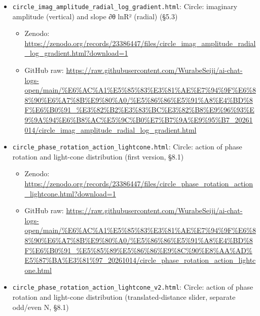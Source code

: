 \documentclass[
  a4paper,
]{article}
\providecommand{\tightlist}{%
  \setlength{\itemsep}{0pt}\setlength{\parskip}{0pt}}
\begin{document}
\begin{itemize}
\tightlist
\item
  \texttt{circle\_\allowbreak{}imag\_\allowbreak{}amplitude\_\allowbreak{}radial\_\allowbreak{}log\_\allowbreak{}gradient.html}: Circle:
  imaginary amplitude (vertical) and slope ∂θ ln\textbar R²\textbar{}
  (radial) (§5.3)

  \begin{itemize}
  \tightlist
  \item
    Zenodo:
    \url{https://zenodo.org/records/23386447/files/circle_imag_amplitude_radial_log_gradient.html?download=1}
  \item
    GitHub raw:
    \url{https://raw.githubusercontent.com/WurabeSeiji/ai-chat-logs-open/main/\%E6\%AC\%A1\%E5\%85\%83\%E3\%81\%AE\%E7\%94\%9F\%E6\%88\%90\%E6\%A7\%8B\%E9\%80\%A0/\%E5\%86\%86\%E5\%91\%A8\%E4\%BD\%8F\%E6\%B0\%91_\%E3\%82\%B2\%E3\%83\%BC\%E3\%82\%B8\%E9\%96\%93\%E9\%9A\%94\%E6\%B8\%AC\%E5\%9C\%B0\%E7\%B7\%9A\%E9\%95\%B7_20261014/circle_imag_amplitude_radial_log_gradient.html}
  \end{itemize}
\item
  \texttt{circle\_\allowbreak{}phase\_\allowbreak{}rotation\_\allowbreak{}action\_\allowbreak{}lightcone.html}: Circle:
  action of phase rotation and light-cone distribution (first version,
  §8.1)

  \begin{itemize}
  \tightlist
  \item
    Zenodo:
    \url{https://zenodo.org/records/23386447/files/circle_phase_rotation_action_lightcone.html?download=1}
  \item
    GitHub raw:
    \url{https://raw.githubusercontent.com/WurabeSeiji/ai-chat-logs-open/main/\%E6\%AC\%A1\%E5\%85\%83\%E3\%81\%AE\%E7\%94\%9F\%E6\%88\%90\%E6\%A7\%8B\%E9\%80\%A0/\%E5\%86\%86\%E5\%91\%A8\%E4\%BD\%8F\%E6\%B0\%91_\%E5\%85\%89\%E5\%86\%86\%E9\%8C\%90\%E8\%AA\%AD\%E5\%87\%BA\%E3\%81\%97_20261014/circle_phase_rotation_action_lightcone.html}
  \end{itemize}
\item
  \texttt{circle\_\allowbreak{}phase\_\allowbreak{}rotation\_\allowbreak{}action\_\allowbreak{}lightcone\_\allowbreak{}v2.html}: Circle:
  action of phase rotation and light-cone distribution
  (translated-distance slider, separate odd/even N, §8.1)


\end{itemize}
\end{document}
